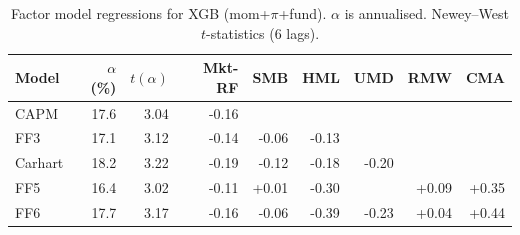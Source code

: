 \begin{table}[H]
\centering
\small
\begin{tabular}{l r r r r r r r r}
\toprule
Model & $\alpha$ (\%) & $t(\alpha)$ & Mkt-RF & SMB & HML & UMD & RMW & CMA \\
\midrule
CAPM & 17.6 & 3.04 & -0.16 &  &  &  &  &  \\
FF3 & 17.1 & 3.12 & -0.14 & -0.06 & -0.13 &  &  &  \\
Carhart & 18.2 & 3.22 & -0.19 & -0.12 & -0.18 & -0.20 &  &  \\
FF5 & 16.4 & 3.02 & -0.11 & +0.01 & -0.30 &  & +0.09 & +0.35 \\
FF6 & 17.7 & 3.17 & -0.16 & -0.06 & -0.39 & -0.23 & +0.04 & +0.44 \\
\bottomrule
\end{tabular}
\caption{Factor model regressions for XGB (mom+$\pi$+fund). $\alpha$ is annualised. Newey--West $t$-statistics (6 lags).}
\label{tab:fund_alphas}
\end{table}
